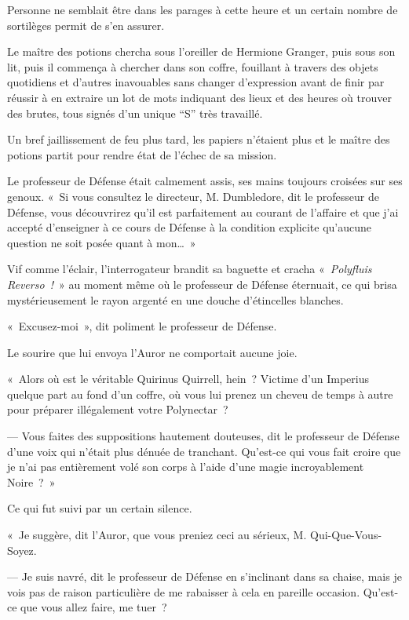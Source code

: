 Personne ne semblait être dans les parages à cette heure et un certain nombre de sortilèges permit de s'en assurer.

Le maître des potions chercha sous l'oreiller de Hermione Granger, puis sous son lit, puis il commença à chercher dans son coffre, fouillant à travers des objets quotidiens et d'autres inavouables sans changer d'expression avant de finir par réussir à en extraire un lot de mots indiquant des lieux et des heures où trouver des brutes, tous signés d'un unique “S” très travaillé.

Un bref jaillissement de feu plus tard, les papiers n'étaient plus et le maître des potions partit pour rendre état de l'échec de sa mission.

\later

Le professeur de Défense était calmement assis, ses mains toujours croisées sur ses genoux. «~Si vous consultez le directeur, M. Dumbledore, dit le professeur de Défense, vous découvrirez qu'il est parfaitement au courant de l'affaire et que j'ai accepté d'enseigner à ce cours de Défense à la condition explicite qu'aucune question ne soit posée quant à mon…~»

Vif comme l'éclair, l'interrogateur brandit sa baguette et cracha «~\emph{Polyfluis Reverso~!}~» au moment même où le professeur de Défense éternuait, ce qui brisa mystérieusement le rayon argenté en une douche d'étincelles blanches.

«~Excusez-moi~», dit poliment le professeur de Défense.

Le sourire que lui envoya l'Auror ne comportait aucune joie.

«~Alors où est le véritable Quirinus Quirrell, hein~? Victime d'un Imperius quelque part au fond d'un coffre, où vous lui prenez un cheveu de temps à autre pour préparer illégalement votre Polynectar~?

--- Vous faites des suppositions hautement douteuses, dit le professeur de Défense d'une voix qui n'était plus dénuée de tranchant. Qu'est-ce qui vous fait croire que je n'ai pas entièrement volé son corps à l'aide d'une magie incroyablement Noire~?~»

Ce qui fut suivi par un certain silence.

«~Je suggère, dit l'Auror, que vous preniez ceci au sérieux, M. Qui-Que-Vous-Soyez.

--- Je suis navré, dit le professeur de Défense en s'inclinant dans sa chaise, mais je vois pas de raison particulière de me rabaisser à cela en pareille occasion. Qu'est-ce que vous allez faire, me tuer~?


